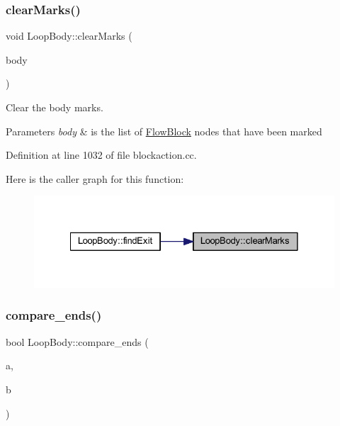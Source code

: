 \subsubsection{\texorpdfstring{clearMarks()}{clearMarks()}}
{\footnotesize\ttfamily void Loop\+Body\+::clear\+Marks (\begin{DoxyParamCaption}\item[{vector$<$ \mbox{\hyperlink{class_flow_block}{Flow\+Block}} $\ast$ $>$ \&}]{body }\end{DoxyParamCaption})\hspace{0.3cm}{\ttfamily [static]}}



Clear the body marks. 


\begin{DoxyParams}{Parameters}
{\em body} & is the list of \mbox{\hyperlink{class_flow_block}{Flow\+Block}} nodes that have been marked \\
\hline
\end{DoxyParams}


Definition at line 1032 of file blockaction.\+cc.

Here is the caller graph for this function\+:
\nopagebreak
\begin{figure}[H]
\begin{center}
\leavevmode
\includegraphics[width=328pt]{class_loop_body_ad6ed614162d7e081baeb297718c0e58c_icgraph}
\end{center}
\end{figure}
\mbox{\label{class_loop_body_af92c183b5af2d39509af1148ffeb8acf}} 
\subsubsection{\texorpdfstring{compare\_ends()}{compare\_ends()}}
{\footnotesize\ttfamily bool Loop\+Body\+::compare\+\_\+ends (\begin{DoxyParamCaption}\item[{\mbox{\hyperlink{class_loop_body}{Loop\+Body}} $\ast$}]{a,  }\item[{\mbox{\hyperlink{class_loop_body}{Loop\+Body}} $\ast$}]{b }\end{DoxyParamCaption})\hspace{0.3cm}{\ttfamily [static]}}



